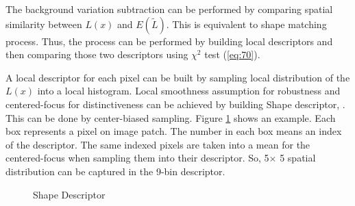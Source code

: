\documentclass[conference]{IEEEtran}
\begin{document}
The background variation subtraction can be performed by comparing spatial similarity between \begin{math} L(x) \end{math}  and \begin{math} E(\tilde{L}) \end{math}. This is equivalent to shape matching process. Thus, the process can be performed by building local descriptors and then comparing those two descriptors using \begin{math} \chi ^2 \end{math} test (\ref{eq:70}).

A local descriptor for each pixel can be built by sampling local distribution of the \begin{math} L(x) \end{math} into a local histogram. Local smoothness assumption for robustness and centered-focus for distinctiveness can be achieved by building Shape descriptor, \cite{Mikolajczyk, Belongie}. This can be done by center-biased sampling. Figure \ref{fig:80} shows an example. Each box represents a pixel on image patch. The number in each box means an index of the descriptor. The same indexed pixels are taken into a mean for the centered-focus when sampling them into their descriptor. So, 5\begin{math} \times \end{math} 5 spatial distribution can be captured in the 9-bin descriptor. 

\begin{figure}[!t]
  \centering
  \label{fig:80}
  \hfill
  \caption{Shape Descriptor}
\end{figure}
\end{document}
